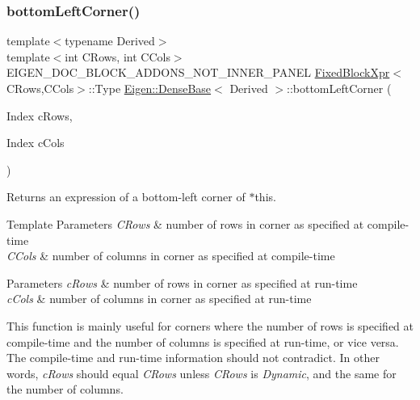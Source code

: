 \subsubsection{\texorpdfstring{bottomLeftCorner()}{bottomLeftCorner()}\hspace{0.1cm}{\footnotesize\ttfamily [3/3]}}
{\footnotesize\ttfamily template$<$typename Derived$>$ \\
template$<$int C\+Rows, int C\+Cols$>$ \\
E\+I\+G\+E\+N\+\_\+\+D\+O\+C\+\_\+\+B\+L\+O\+C\+K\+\_\+\+A\+D\+D\+O\+N\+S\+\_\+\+N\+O\+T\+\_\+\+I\+N\+N\+E\+R\+\_\+\+P\+A\+N\+EL \mbox{\hyperlink{struct_eigen_1_1_dense_base_1_1_fixed_block_xpr}{Fixed\+Block\+Xpr}}$<$C\+Rows,C\+Cols$>$\+::Type \mbox{\hyperlink{class_eigen_1_1_dense_base}{Eigen\+::\+Dense\+Base}}$<$ Derived $>$\+::bottom\+Left\+Corner (\begin{DoxyParamCaption}\item[{Index}]{c\+Rows,  }\item[{Index}]{c\+Cols }\end{DoxyParamCaption})\hspace{0.3cm}{\ttfamily [inline]}}

\begin{DoxyReturn}{Returns}
an expression of a bottom-\/left corner of $\ast$this.
\end{DoxyReturn}

\begin{DoxyTemplParams}{Template Parameters}
{\em C\+Rows} & number of rows in corner as specified at compile-\/time \\
\hline
{\em C\+Cols} & number of columns in corner as specified at compile-\/time \\
\hline
\end{DoxyTemplParams}

\begin{DoxyParams}{Parameters}
{\em c\+Rows} & number of rows in corner as specified at run-\/time \\
\hline
{\em c\+Cols} & number of columns in corner as specified at run-\/time\\
\hline
\end{DoxyParams}
This function is mainly useful for corners where the number of rows is specified at compile-\/time and the number of columns is specified at run-\/time, or vice versa. The compile-\/time and run-\/time information should not contradict. In other words, {\itshape c\+Rows} should equal {\itshape C\+Rows} unless {\itshape C\+Rows} is {\itshape Dynamic}, and the same for the number of columns.

